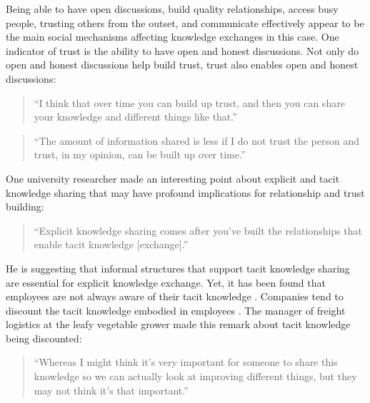 Being able to have open discussions, build quality relationships, access busy people, trusting others from the outset, and communicate effectively appear to be the main social mechanisms affecting knowledge exchanges in this case. One indicator of trust is the ability to have open and honest discussions. Not only do open and honest discussions help build trust, trust also enables open and honest discussions:

\begin{quote}
\small
\enquote{I think that over time you can build up trust, and then you can share your knowledge and different things like that.} \\
\end{quote}

\begin{quote}
\small
\enquote{The amount of information shared is less if I do not trust the person and trust, in my opinion, can be built up over time.} \\
\end{quote}

One university researcher made an interesting point about explicit and tacit knowledge sharing that may have profound implications for relationship and trust building:

\begin{quote}
\small
\enquote{Explicit knowledge sharing comes after you've built the relationships that enable tacit knowledge [exchange].} \\
\end{quote}

He is suggesting that informal structures that support tacit knowledge sharing are essential for explicit knowledge exchange. Yet, it has been found that employees are not always aware of their tacit knowledge \citep{polanyi1966tacit, horvath2000working}. Companies tend to discount the tacit knowledge embodied in employees \citep{mcadam2007exploring}. The manager of freight logistics at the leafy vegetable grower made this remark about tacit knowledge being discounted:

\begin{quote}
\small
\enquote{Whereas I might think it's very important for someone to share this knowledge so we can actually look at improving different things, but they may not think it's that important.} \\
\end{quote}

